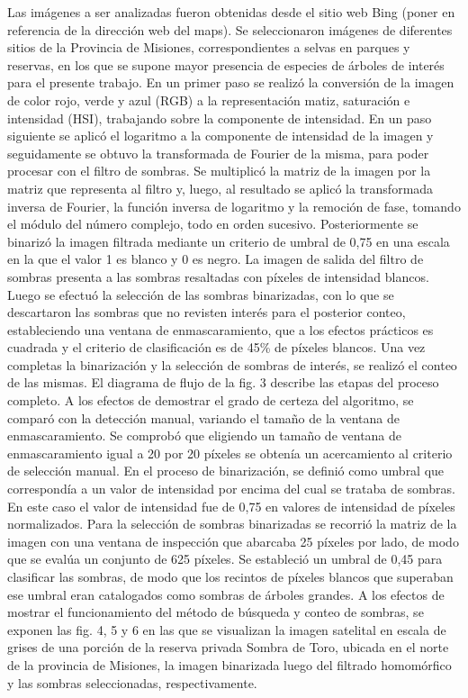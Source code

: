 Las imágenes a ser analizadas fueron obtenidas desde el sitio web Bing (poner en referencia de la dirección web del maps). Se seleccionaron imágenes de diferentes sitios de la Provincia de Misiones, correspondientes a selvas en parques y reservas, en los que se supone mayor presencia de especies de árboles de interés para el presente trabajo. 
En un primer paso se realizó la conversión de la imagen de color rojo, verde y azul (RGB) a la representación matiz, saturación e intensidad (HSI), trabajando sobre la componente de intensidad. En un paso siguiente se aplicó el logaritmo a la componente de intensidad de la imagen y seguidamente se obtuvo la transformada de Fourier de la misma, para poder procesar con el filtro de sombras. Se multiplicó la matriz de la imagen por la matriz que representa al filtro y, luego, al resultado se aplicó la transformada inversa de Fourier, la función inversa de logaritmo y la remoción de fase, tomando el módulo del número complejo, todo en orden sucesivo. Posteriormente se binarizó la imagen filtrada mediante un criterio de umbral de 0,75 en una escala en la que el valor 1 es blanco y 0 es negro. La imagen de salida del filtro de sombras presenta a las sombras resaltadas con píxeles de intensidad blancos. 
Luego se efectuó la selección de las sombras binarizadas, con lo que se descartaron las sombras que no revisten interés para el posterior conteo, estableciendo una ventana de enmascaramiento, que a los efectos prácticos es cuadrada y el criterio de clasificación es de 45\% de píxeles blancos. Una vez completas la binarización y la selección de sombras de interés, se realizó el conteo de las mismas. El diagrama de flujo de la fig. 3 describe las etapas del proceso completo. A los efectos de demostrar el grado de certeza del algoritmo, se comparó con la detección manual, variando el tamaño de la ventana de enmascaramiento. Se comprobó que eligiendo un tamaño de ventana de enmascaramiento igual a 20 por 20 píxeles se obtenía un acercamiento al criterio de selección manual.
En el proceso de binarización, se definió como umbral que correspondía a un valor de intensidad por encima del cual se trataba de sombras. En este caso el valor de intensidad fue de 0,75 en valores de intensidad de píxeles normalizados.
Para la selección de sombras binarizadas se recorrió la matriz de la imagen con una ventana de inspección que abarcaba 25 píxeles por lado, de modo que se evalúa un conjunto de 625 píxeles. Se estableció un umbral de 0,45 para clasificar las sombras, de modo que los recintos de píxeles blancos que superaban ese umbral eran catalogados como sombras de árboles grandes.
A los efectos de mostrar el funcionamiento del método de búsqueda y conteo de sombras, se exponen las fig. 4, 5 y 6 en las que se visualizan la imagen satelital en escala de grises de una porción de la reserva privada Sombra de Toro, ubicada en el norte de la provincia de Misiones, la imagen binarizada luego del filtrado homomórfico y las sombras seleccionadas, respectivamente.

